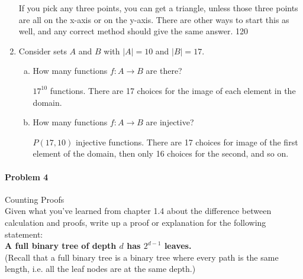 \documentclass[11pt, a4paper]{article}
\newcommand\setItemNumber[1]{\setcounter{enumi}{\numexpr#1-1\relax}}
\begin{document}
\begin{enumerate}
            If you pick any three points, you can get a triangle, unless those three points are all on the x-axis or on the y-axis. There are other ways to start this as well, and any correct method should give the same answer. 120

        \setItemNumber{12}
        \item Consider sets $A$ and $B$ with $|A| = 10$ and $|B| = 17$.
            \begin{enumerate}[(a)]
                \item How many functions $f: A\rightarrow B$ are there?

                    $17^{10}$ functions. There are 17 choices for the image of each element in the domain.

                \item How many functions $f: A\rightarrow B$ are injective?

                    $P(17, 10)$ injective functions. There are 17 choices for image of the first element of the domain, then only 16 choices for the second, and so on.

            \end{enumerate}

    \end{enumerate}


	
	\paragraph{Problem 4} Counting Proofs\\

	Given what you've learned from chapter 1.4 about the difference between calculation and proofs, write up a proof or explanation for the following statement:\\

	\textbf{A full binary tree of depth $d$ has $2^{d-1}$ leaves.} \\

	(Recall that a full binary tree is a binary tree where every path is the same length, i.e. all the leaf nodes are at the same depth.)
	
		
\end{document}
